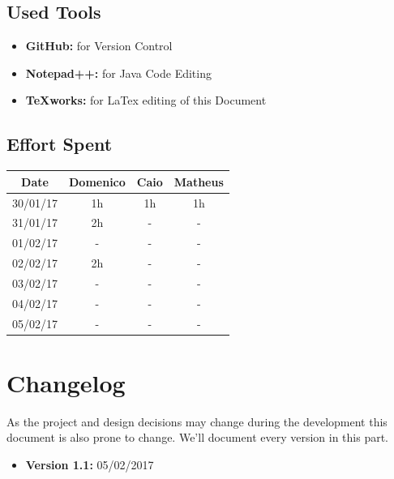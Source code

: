 \documentclass[a4paper]{article}
\begin{document}
\subsection{Used Tools}
\begin{itemize}
	\item \textbf{GitHub:} for Version Control
	\item \textbf {Notepad++:} for Java Code Editing
	\item \textbf {TeXworks:} for LaTex editing of this Document
\end{itemize}

\newpage
\subsection{Effort Spent}
\begin{tabular}{ | c | c | c | c | }
\hline
	\textbf {Date} & \textbf {Domenico} & \textbf {Caio} & \textbf {Matheus} \\ \hline
	30/01/17& 1h & 1h & 1h  \\ \hline
	31/01/17& 2h & - & -  \\ \hline
	01/02/17& - & - & -  \\ \hline
	02/02/17& 2h & - & -  \\ \hline
	03/02/17& - & - & -  \\ \hline
	04/02/17& - & - & -  \\ \hline
	05/02/17& - & - & -  \\ \hline

\end{tabular}
\newpage

\section{Changelog}
As the project and design decisions may change during the development this document is also prone to change.
We'll document every version in this part.
\begin{itemize}
\item \textbf {Version 1.1:} 05/02/2017
\end{itemize}
\end{document}

